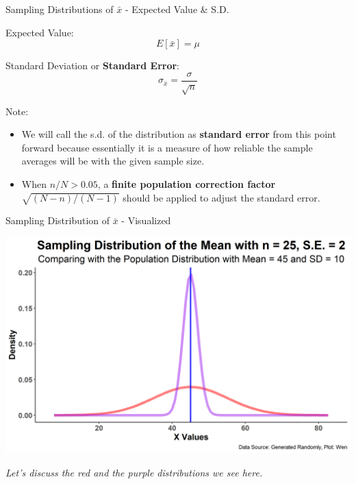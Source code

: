 \documentclass{beamer}
\begin{document}
\begin{frame}{Sampling Distributions of $\bar{x}$ - Expected Value \& S.D.}


Expected Value: 
$$E \left[ \bar{x} \right] = \mu $$  

Standard Deviation or \textbf{Standard Error}: 
$$ \sigma_{\bar{x}} = \frac{\sigma}{\sqrt{n}}$$

\vspace{0.3 cm}

Note:
\begin{itemize}
\item We will call the s.d. of the distribution as \textbf{standard error} from this point forward because essentially it is a measure of how reliable the sample averages will be with the given sample size. 
\item When $ n/N > 0.05 $, a \textbf{finite population correction factor} $\sqrt{(N-n)/(N-1)}$ should be applied to adjust the standard error.

\end{itemize}


\end{frame}




\begin{frame}{Sampling Distribution of $\bar{x}$ - Visualized}


\begin{center}
\includegraphics[scale=0.5]{images/samplingDistMean.png}
\end{center}

\begin{center}
\textit{Let's discuss the red and the purple distributions we see here.}
\end{center}
\end{frame}
\end{document}
